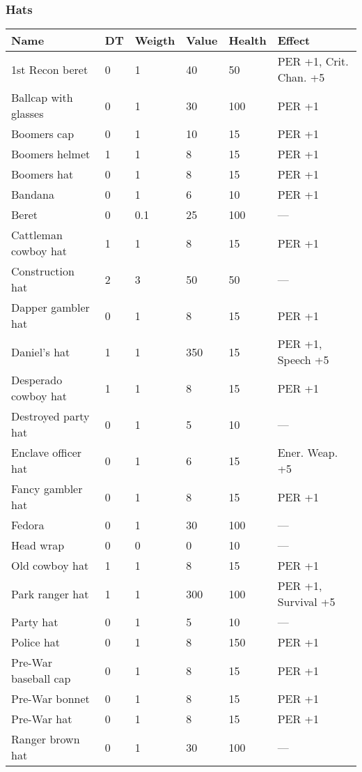 
\subsubsection{Hats}
\begin{longtable}{|p{4cm}|p{1.2cm}|p{1.2cm}|p{1.2cm}|p{1.2cm}|p{6cm}|}
\hline
\bfseries Name & \bfseries DT & \bfseries Weigth & \bfseries Value & \bfseries Health & \bfseries Effect \\
\hline
\endhead
1st Recon beret  & 0 & 1 & 40 & 50 & PER +1, Crit. Chan. +5  \\
Ballcap with glasses  & 0 & 1 & 30 & 100 & PER +1  \\
Boomers cap  & 0 & 1 & 10 & 15 & PER +1  \\
Boomers helmet  & 1 & 1 & 8 & 15 & PER +1  \\
Boomers hat  & 0 & 1 & 8 & 15 & PER +1  \\
Bandana  & 0 & 1 & 6 & 10 & PER +1  \\
Beret  & 0 & 0.1  & 25 & 100 & —  \\
Cattleman cowboy hat  & 1 & 1 & 8 & 15 & PER +1  \\
Construction hat  & 2 & 3 & 50 & 50 & —  \\
Dapper gambler hat  & 0 & 1 & 8 & 15 & PER +1  \\
Daniel's hat  & 1 & 1 & 350 & 15 & PER +1, Speech +5  \\
Desperado cowboy hat  & 1 & 1 & 8 & 15 & PER +1  \\
Destroyed party hat  & 0 & 1 & 5 & 10 & —  \\
Enclave officer hat  & 0 & 1 & 6 & 15 & Ener. Weap. +5  \\
Fancy gambler hat  & 0 & 1 & 8 & 15 & PER +1  \\
Fedora  & 0 & 1 & 30 & 100 & —  \\
Head wrap  & 0 & 0 & 0 & 10 & —  \\
Old cowboy hat  & 1 & 1 & 8 & 15 & PER +1  \\
Park ranger hat  & 1 & 1 & 300 & 100 & PER +1, Survival +5  \\
Party hat  & 0 & 1 & 5 & 10 & —  \\
Police hat  & 0 & 1 & 8 & 150 & PER +1  \\
Pre-War baseball cap  & 0 & 1 & 8 & 15 & PER +1  \\
Pre-War bonnet  & 0 & 1 & 8 & 15 & PER +1  \\
Pre-War hat  & 0 & 1 & 8 & 15 & PER +1  \\
Ranger brown hat  & 0 & 1 & 30 & 100 & —  \\

\end{longtable}
